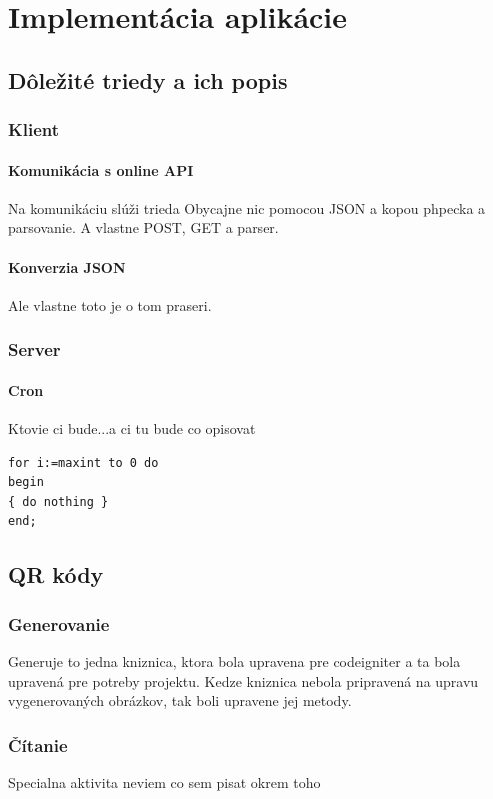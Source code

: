 \chapter{Implementácia aplikácie}


\section{Dôležité triedy a ich popis}
\subsection{Klient}
\subsubsection{Komunikácia s online API}
Na komunikáciu slúži trieda
Obycajne nic pomocou JSON a kopou phpecka a parsovanie. A vlastne POST, GET a parser.
\subsubsection{Konverzia JSON}
Ale vlastne toto je o tom praseri.
\subsection{Server}
\subsubsection{Cron}
Ktovie ci bude...a ci tu bude co opisovat

\lstset{language=Java}          %

\begin{lstlisting}[frame=single]  % Start your code-block
for i:=maxint to 0 do
begin
{ do nothing }
end;
\end{lstlisting}

\section{QR kódy}
\subsection{Generovanie}
Generuje to jedna kniznica, ktora bola upravena pre codeigniter a ta bola upravená pre potreby projektu. Kedze kniznica nebola pripravená na upravu vygenerovaných obrázkov, tak boli upravene jej metody.
\subsection{Čítanie}
Specialna aktivita neviem co sem pisat okrem toho


